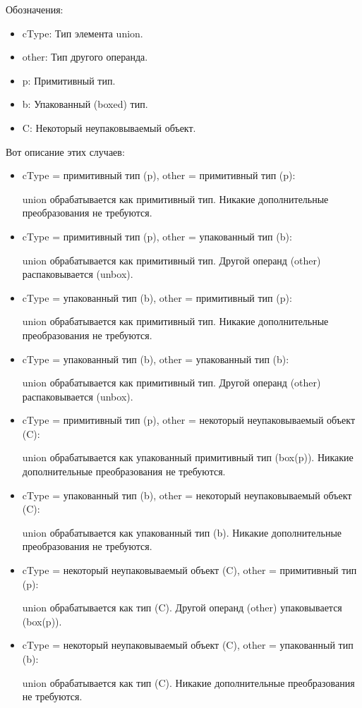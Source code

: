 Обозначения:
\begin{itemize}[left=2em]
    \item cType: Тип элемента union.
    \item other: Тип другого операнда.
    \item p: Примитивный тип.
    \item b: Упакованный (boxed) тип.
    \item C: Некоторый неупаковываемый объект.
\end{itemize}
Вот описание этих случаев:
\begin{itemize}[left=2em]
    \item cType = примитивный тип (p), other = примитивный тип (p):

    union обрабатывается как примитивный тип.
    Никакие дополнительные преобразования не требуются.

    \item cType = примитивный тип (p), other = упакованный тип (b):

    union обрабатывается как примитивный тип.
    Другой операнд (other) распаковывается (unbox).

    \item cType = упакованный тип (b), other = примитивный тип (p):

    union обрабатывается как примитивный тип.
    Никакие дополнительные преобразования не требуются.

    \item cType = упакованный тип (b), other = упакованный тип (b):

    union обрабатывается как примитивный тип.
    Другой операнд (other) распаковывается (unbox).

    \item cType = примитивный тип (p), other = некоторый неупаковываемый объект (C):

    union обрабатывается как упакованный примитивный тип (box(p)).
    Никакие дополнительные преобразования не требуются.

    \item cType = упакованный тип (b), other = некоторый неупаковываемый объект (C):

    union обрабатывается как упакованный тип (b).
    Никакие дополнительные преобразования не требуются.

    \item cType = некоторый неупаковываемый объект (C), other = примитивный тип (p):

    union обрабатывается как тип (C).
    Другой операнд (other) упаковывается (box(p)).

    \item cType = некоторый неупаковываемый объект (C), other = упакованный тип (b):

    union обрабатывается как тип (C).
    Никакие дополнительные преобразования не требуются.
\end{itemize}

